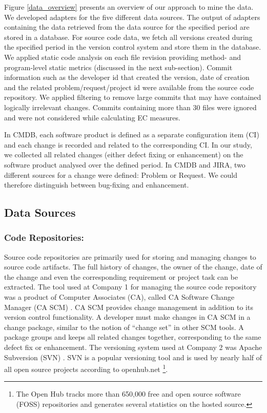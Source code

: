 \documentclass[times]{smrauth}
\begin{document}
Figure \ref{data_overview} presents an overview of our approach to mine the data. We developed adapters for the five different data sources. The output of adapters containing the data retrieved from the data source for the specified period are stored in a database.  For source code data, we fetch all versions created during the specified period in the version control system and store them in the database. We applied static code analysis on each file revision providing method- and program-level static metrics (discussed in the next sub-section). Commit information such as the developer id that created the version, date of creation and the related problem/request/project id were available from the source code repository. We applied filtering to remove large commits that may have contained logically irrelevant changes. Commits containing more than 30 files were ignored and were not considered while calculating EC measures.

In CMDB, each software product is defined as a separate configuration item (CI) and each change is recorded and related to the corresponding CI. In our study, we collected all related changes (either  defect fixing or enhancement) on the software product analysed over the defined period. In CMDB and JIRA, two different sources for a change were defined: Problem or Request. We could therefore distinguish between bug-fixing and enhancement.    


\subsection{Data Sources}

\subsubsection{Code Repositories:}
Source code repositories are primarily used for storing and managing changes to source code artifacts. The full history of changes, the owner of the change, date of the change and even the corresponding requirement or project task can be extracted.  The tool used at Company 1 for managing the source code repository was a product of Computer Associates (CA), called CA Software Change Manager (CA SCM) \cite{CASCM:2013:Online}.  CA SCM provides change management in addition to its version control functionality. A developer must make changes in CA SCM in a change package, similar to the notion of ``change set'' in other SCM tools. A package groups and keeps all related changes together, corresponding to the same  defect fix or enhancement. The versioning system used at Company 2 was Apache Subversion (SVN) \cite{SVN:2015:Online}. SVN is a popular versioning tool and is used by nearly half of all open source projects according to openhub.net \footnote{The Open Hub tracks more than 650,000 free and open source software (FOSS) repositories and generates several statistics on the hosted source.}.
\end{document}
